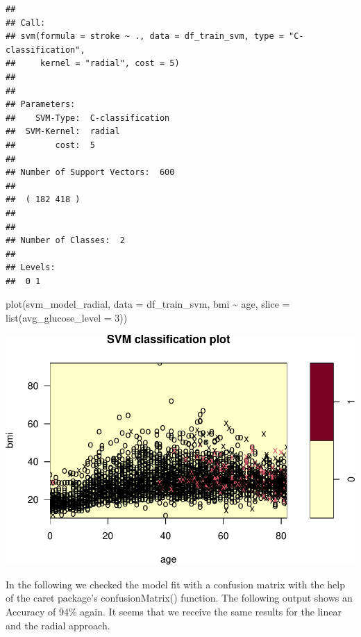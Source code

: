 \documentclass[
]{article}
\newenvironment{Shaded}{\begin{snugshade}}{\end{snugshade}}
\newcommand{\AttributeTok}[1]{\textcolor[rgb]{0.77,0.63,0.00}{#1}}
\newcommand{\CommentTok}[1]{\textcolor[rgb]{0.56,0.35,0.01}{\textit{#1}}}
\newcommand{\DecValTok}[1]{\textcolor[rgb]{0.00,0.00,0.81}{#1}}
\newcommand{\FunctionTok}[1]{\textcolor[rgb]{0.00,0.00,0.00}{#1}}
\newcommand{\NormalTok}[1]{#1}
\newcommand{\OtherTok}[1]{\textcolor[rgb]{0.56,0.35,0.01}{#1}}
\newcommand{\SpecialCharTok}[1]{\textcolor[rgb]{0.00,0.00,0.00}{#1}}
\renewcommand{\=}[1]{\stackrel{#1}{=}}
\theoremstyle{definition}
\theoremstyle{remark}
\begin{document}
\begin{verbatim}
## 
## Call:
## svm(formula = stroke ~ ., data = df_train_svm, type = "C-classification", 
##     kernel = "radial", cost = 5)
## 
## 
## Parameters:
##    SVM-Type:  C-classification 
##  SVM-Kernel:  radial 
##        cost:  5 
## 
## Number of Support Vectors:  600
## 
##  ( 182 418 )
## 
## 
## Number of Classes:  2 
## 
## Levels: 
##  0 1
\end{verbatim}

\begin{Shaded}
\begin{Highlighting}[]
\FunctionTok{plot}\NormalTok{(svm\_model\_radial, }\AttributeTok{data =}\NormalTok{ df\_train\_svm, bmi }\SpecialCharTok{\textasciitilde{}}\NormalTok{ age, }\AttributeTok{slice =} \FunctionTok{list}\NormalTok{(}\AttributeTok{avg\_glucose\_level =} \DecValTok{3}\NormalTok{))}
\end{Highlighting}
\end{Shaded}

\includegraphics{sioux_mach_learn_project_files/figure-latex/unnamed-chunk-83-1.pdf}

In the following we checked the model fit with a confusion matrix with the help of the caret package's confusionMatrix() function. The following output shows an Accuracy of 94\% again. It seems that we receive the same results for the linear and the radial approach.

\begin{Shaded}
\end{Shaded}
\end{document}
